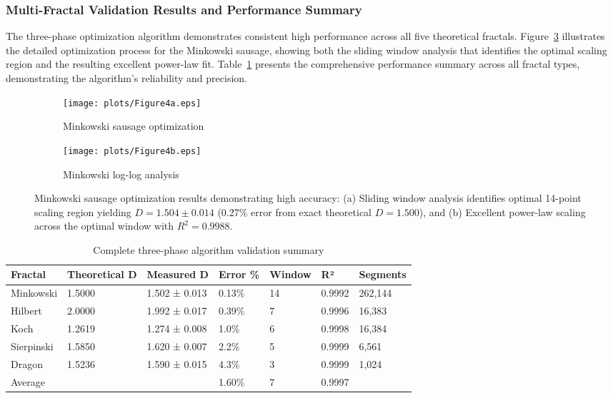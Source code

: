 \documentclass[preprint,12pt]{elsarticle}
\def\textbf#1{#1}%
\begin{document}
\subsubsection{Multi-Fractal Validation Results and Performance Summary}

The three-phase optimization algorithm demonstrates consistent high performance across all five theoretical fractals. Figure~\ref{fig:minkowski_results} illustrates the detailed optimization process for the Minkowski sausage, showing both the sliding window analysis that identifies the optimal scaling region and the resulting excellent power-law fit. Table~\ref{tab:complete_validation} presents the comprehensive performance summary across all fractal types, demonstrating the algorithm's reliability and precision.

\begin{figure}[tbp]
\centering
\begin{subfigure}[b]{0.8\textwidth}
    \centering
    \texttt{[image: plots/Figure4a.eps]}
    \caption{Minkowski sausage optimization}
    \label{fig:minkowski_optimized}
\end{subfigure}

\vspace{0.3cm}

\begin{subfigure}[b]{0.8\textwidth}
    \centering
    \texttt{[image: plots/Figure4b.eps]}
    \caption{Minkowski log-log analysis}
    \label{fig:minkowski_loglog}
\end{subfigure}
\caption{Minkowski sausage optimization results demonstrating high accuracy: (a) Sliding window analysis identifies optimal 14-point scaling region yielding $D = 1.504 \pm 0.014$ (0.27\% error from exact theoretical $D = 1.500$), and (b) Excellent power-law scaling across the optimal window with $R^2 = 0.9988$.}
\label{fig:minkowski_results}
\end{figure}


\begin{table}[H]
\centering
\footnotesize
\begin{tabularx}{\textwidth}{@{}lXXXXXX@{}}
\toprule
\textbf{Fractal} & \textbf{Theoretical D} & \textbf{Measured D} & \textbf{Error \%} & \textbf{Window} & \textbf{R²} & \textbf{Segments} \\
\midrule
Minkowski & 1.5000 & 1.502 ± 0.013 & \textbf{0.13\%} & 14 & 0.9992 & 262,144 \\
Hilbert & 2.0000 & 1.992 ± 0.017 & \textbf{0.39\%} & 7 & 0.9996 & 16,383 \\
Koch & 1.2619 & 1.274 ± 0.008 & \textbf{1.0\%} & 6 & 0.9998 & 16,384 \\
Sierpinski & 1.5850 & 1.620 ± 0.007 & \textbf{2.2\%} & 5 & 0.9999 & 6,561 \\
Dragon & 1.5236 & 1.590 ± 0.015 & \textbf{4.3\%} & 3 & 0.9999 & 1,024 \\
\midrule
\textbf{Average} & & & \textbf{1.60\%} & \textbf{7} & \textbf{0.9997} & \\
\bottomrule
\end{tabularx}
\caption{Complete three-phase algorithm validation summary}
\label{tab:complete_validation}
\end{table}
\end{document}
